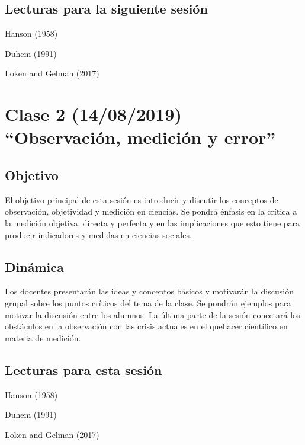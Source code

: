 \documentclass[11pt,]{article}
\begin{document}
\hypertarget{lecturas-para-la-siguiente-sesion}{%
\subsection{Lecturas para la siguiente
sesión}\label{lecturas-para-la-siguiente-sesion}}

Hanson (1958)

Duhem (1991)

Loken and Gelman (2017)

\hypertarget{clase-2-14082019-observacion-medicion-y-error}{%
\section{Clase 2 (14/08/2019) ``Observación, medición y
error''}\label{clase-2-14082019-observacion-medicion-y-error}}

\hypertarget{objetivo-1}{%
\subsection{Objetivo}\label{objetivo-1}}

El objetivo principal de esta sesión es introducir y discutir los
conceptos de observación, objetividad y medición en ciencias. Se pondrá
énfasis en la crítica a la medición objetiva, directa y perfecta y en
las implicaciones que esto tiene para producir indicadores y medidas en
ciencias sociales.

\hypertarget{dinamica-1}{%
\subsection{Dinámica}\label{dinamica-1}}

Los docentes presentarán las ideas y conceptos básicos y motivarán la
discusión grupal sobre los puntos críticos del tema de la clase. Se
pondrán ejemplos para motivar la discusión entre los alumnos. La última
parte de la sesión conectará los obstáculos en la observación con las
crisis actuales en el quehacer científico en materia de medición.

\hypertarget{lecturas-para-esta-sesion}{%
\subsection{Lecturas para esta sesión}\label{lecturas-para-esta-sesion}}

Hanson (1958)

Duhem (1991)

Loken and Gelman (2017)
\end{document}
